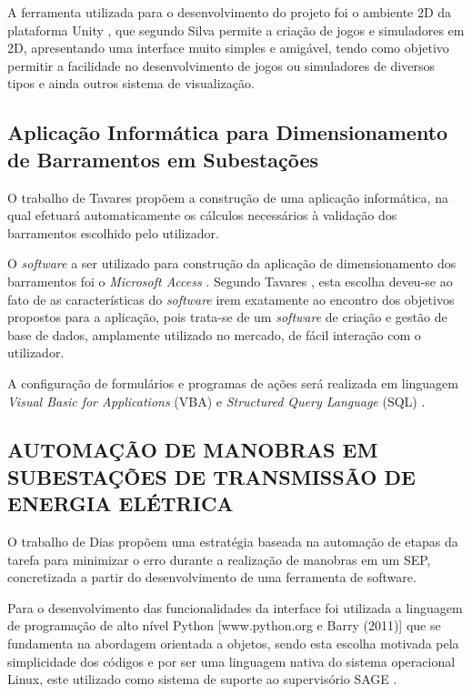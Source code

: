 A ferramenta utilizada para o desenvolvimento do projeto foi o ambiente 2D da plataforma Unity , que segundo Silva \citeyearpar{silva2017simulador} permite a criação de jogos e simuladores em 2D, apresentando uma interface muito simples e amigável, tendo como objetivo permitir a facilidade no desenvolvimento de jogos ou simuladores de diversos tipos e ainda outros sistema de visualização.


\subsection{Aplicação Informática para Dimensionamento de Barramentos em Subestações}

O trabalho de Tavares \citeyearpar{tavares2015aplicaccao} propõem a construção de uma aplicação informática, na qual efetuará automaticamente os cálculos necessários à validação dos barramentos escolhido pelo utilizador.

O \textit{software} a ser utilizado para construção da aplicação de dimensionamento dos barramentos foi o \textit{Microsoft Access} \cite{tavares2015aplicaccao}. Segundo Tavares \citeyearpar{tavares2015aplicaccao}, esta escolha deveu-se ao fato de as características do \textit{software} irem exatamente ao encontro dos objetivos propostos para a aplicação, pois trata-se de um \textit{software} de criação e gestão de base de dados, amplamente utilizado no mercado, de fácil interação com o utilizador.

A configuração de formulários e programas de ações será realizada em linguagem \textit{Visual Basic for Applications} (VBA) e \textit{Structured Query Language} (SQL) \cite{tavares2015aplicaccao}.


\subsection{AUTOMAÇÃO DE MANOBRAS EM SUBESTAÇÕES DE
TRANSMISSÃO DE ENERGIA ELÉTRICA}

O trabalho de Dias \citeyearpar{dias2017automaccao} propõem uma estratégia baseada na automação de etapas da tarefa para minimizar o erro durante a realização de manobras em um SEP, concretizada a partir do desenvolvimento de uma ferramenta de software. 

Para o desenvolvimento das funcionalidades da interface foi utilizada a linguagem de programação de alto nível Python [www.python.org e Barry (2011)] que se fundamenta na abordagem orientada a objetos, sendo esta escolha motivada pela simplicidade dos códigos e por ser uma linguagem nativa do sistema operacional Linux, este utilizado como sistema de suporte ao supervisório SAGE \cite{dias2017automaccao}.


